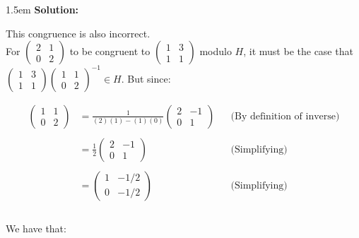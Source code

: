 \documentclass{article}
\newenvironment{solution}{
	\vspace{.5em}
	\par
	\begin{adjustwidth}{1.5em}{}
	\textbf{{Solution:}}
	\par
	\vspace{.5em}
}{
	\vspace{1em}
	\end{adjustwidth}
	\setcounter{step}{0}
}
\newcounter{step}
\begin{document}
\begin{solution}
	This congruence is also incorrect. \\

	For $\begin{pmatrix} 2 & 1 \\ 0 & 2 \end{pmatrix}$ to be congruent to $\begin{pmatrix} 1 & 3 \\ 1 & 1 \end{pmatrix}$ modulo $H$, it must be the case that $\begin{pmatrix} 1 & 3 \\ 1 & 1 \end{pmatrix}\begin{pmatrix} 1 & 1 \\ 0 & 2 \end{pmatrix}^{-1} \in H$. But since:

	\begin{align*}
		\begin{pmatrix}
			1 & 1 \\
			0 & 2
		\end{pmatrix}
		&= \frac{1}{(2)(1) - (1)(0)}
		\begin{pmatrix}
			2 & -1 \\
			0 & 1
		\end{pmatrix}
		&&\text{(By definition of inverse)} \\\\
		&= \frac{1}{2}\begin{pmatrix}
			2 & -1 \\
			0 & 1
		\end{pmatrix}
		&&\text{(Simplifying)} \\\\
		&= \begin{pmatrix}
			1 & -1/2 \\
			0 & -1/2
		\end{pmatrix}
		&&\text{(Simplifying)} \\\\
	\end{align*}

	We have that:


\end{solution}
\end{document}

